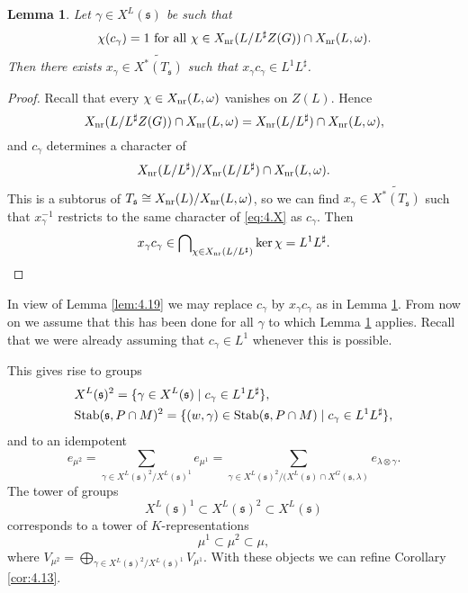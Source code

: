 \documentclass[11pt]{amsart}
\newtheorem{lem}[thm]{Lemma}
\theoremstyle{definition}
\begin{document}
\begin{lem}\label{lem:4.10}
Let $\gamma \in X^L ({{\mathfrak s}})$ be such that 
\[
\chi (c_\gamma) = 1 \text{ for all } 
\chi \in X_{{\rm nr}} (L / L^\sharp Z(G)) \cap X_{{\rm nr}} (L,\omega).
\] 
Then there exists $x_\gamma \in \widetilde{X^* (T_{{\mathfrak s}})}$ such that 
$x_\gamma c_\gamma \in L^1 L^\sharp$.
\end{lem}
\begin{proof}
Recall that every $\chi \in X_{{\rm nr}} (L,\omega)$ vanishes on $Z(L)$. Hence 
\[
X_{{\rm nr}} (L / L^\sharp Z(G)) \cap X_{{\rm nr}} (L,\omega) = 
X_{{\rm nr}} (L / L^\sharp) \cap X_{{\rm nr}} (L,\omega) ,
\]
and $c_\gamma$ determines a character of 
\begin{equation}\label{eq:4.X}
X_{{\rm nr}} (L / L^\sharp) / X_{{\rm nr}} (L / L^\sharp) \cap X_{{\rm nr}} (L,\omega) . 
\end{equation}
This is a subtorus of $T_{{\mathfrak s}} \cong X_{{\rm nr}} (L) / X_{{\rm nr}} (L,\omega)$,
so we can find $x_\gamma \in \widetilde{X^* (T_{{\mathfrak s}})}$ such that $x_\gamma^{-1}$
restricts to the same character of \eqref{eq:4.X} as $c_\gamma$. Then
\[
x_\gamma c_\gamma \in \bigcap\nolimits_{\chi \in X_{{\rm nr}} (L / L^\sharp)} \ker \chi 
= L^1 L^\sharp . \qedhere 
\]
\end{proof}

In view of Lemma \ref{lem:4.19} we may replace $c_\gamma$ by $x_\gamma c_\gamma$
as in Lemma \ref{lem:4.10}. From now on we assume that this has been done
for all $\gamma$ to which Lemma \ref{lem:4.10} applies. Recall that we were already 
assuming that $c_\gamma \in L^1$ whenever this is possible.

This gives rise to groups \label{i:52} \label{i:75}
\begin{align*}
& X^L ({{\mathfrak s}})^2 = \{ \gamma \in X^L ({{\mathfrak s}}) \mid c_\gamma \in L^1 L^\sharp \} ,\\
& {{\rm Stab}} ({{\mathfrak s}},P \cap M)^2 = 
\{ (w,\gamma) \in {{\rm Stab}} ({{\mathfrak s}}, P \cap M) \mid c_\gamma \in L^1 L^\sharp \} ,
\end{align*}
and to an idempotent \label{i:11}
\[
e_{\mu^2} = \sum_{\gamma \in X^L ({{\mathfrak s}})^2 / X^L ({{\mathfrak s}})^1} e_{\mu^1} = 
\sum_{\gamma \in X^L ({{\mathfrak s}})^2 / (X^L ({{\mathfrak s}}) \cap X^G ({{\mathfrak s}},\lambda)} 
e_{\lambda \otimes \gamma} . 
\]
The tower of groups 
\[
X^L ({{\mathfrak s}})^1 \subset X^L ({{\mathfrak s}})^2 \subset X^L ({{\mathfrak s}})
\]
corresponds to a tower of $K$-representations
\[
\mu^1 \subset \mu^2 \subset \mu ,
\]
where $V_{\mu^2} = \bigoplus_{\gamma \in X^L ({{\mathfrak s}})^2 / X^L ({{\mathfrak s}})^1} V_{\mu^1}$.
With these objects we can refine Corollary \ref{cor:4.13}.
\end{document}

